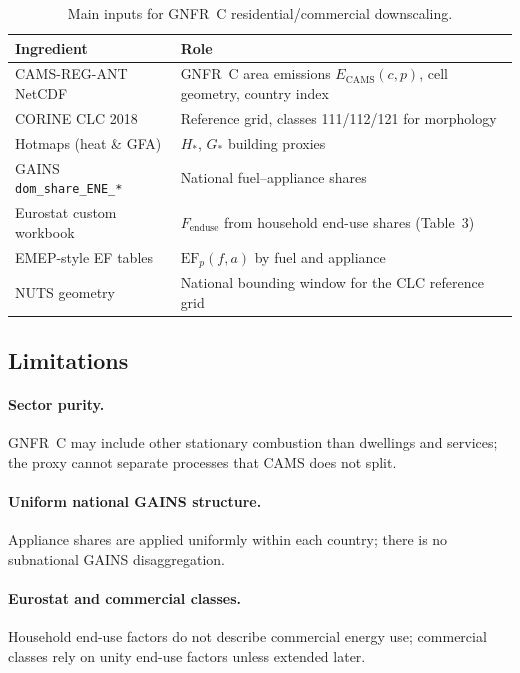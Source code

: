 \begin{table}[htbp]
  \centering
  \caption{Main inputs for GNFR~C residential/commercial downscaling.}
  \label{tab:rescom_inputs}
  \begin{tabular}{p{3.2cm}p{9.5cm}}
    \hline
    Ingredient & Role \\
    \hline
    CAMS-REG-ANT NetCDF & GNFR~C area emissions $E_{\mathrm{CAMS}}(c,p)$,
      cell geometry, country index \\
    CORINE CLC 2018 & Reference grid, classes 111/112/121 for morphology \\
    Hotmaps (heat \& GFA) & $H_{\ast}$, $G_{\ast}$ building proxies \\
    GAINS \texttt{dom\_share\_ENE\_*} & National fuel--appliance shares \\
    Eurostat custom workbook & $F_{\mathrm{enduse}}$ from household end-use
      shares (Table~3) \\
    EMEP-style EF tables & $\mathrm{EF}_p(f,a)$ by fuel and appliance \\
    NUTS geometry & National bounding window for the CLC reference grid \\
    \hline
  \end{tabular}
\end{table}

\subsection{Limitations}

\paragraph{Sector purity.} GNFR~C may include other stationary combustion than
dwellings and services; the proxy cannot separate processes that CAMS does not
split.

\paragraph{Uniform national GAINS structure.} Appliance shares are applied
uniformly within each country; there is no subnational GAINS disaggregation.

\paragraph{Eurostat and commercial classes.} Household end-use factors do not
describe commercial energy use; commercial classes rely on unity end-use
factors unless extended later.

